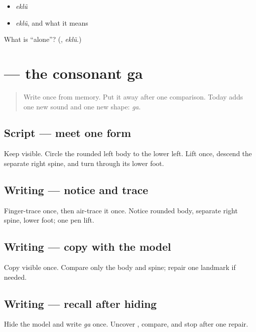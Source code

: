 \begin{itemize}
\raggedright
  \item \emph{eklũ}
  \item \emph{eklũ}, and what it means
\end{itemize}

\begin{tcolorbox}[breakable,colback=teal!4,colframe=teal!35!black,title={Before you move on}]
What is \textquotedblleft{}alone\textquotedblright{}? (\textbf{}, \emph{eklũ}.)
\end{tcolorbox}
\section[\texorpdfstring{\gu{ગ} (ga)}{ગ (ga)}]{ — the consonant ga}

\label{lesson:GU-W06-ga}



\begin{quote}
Write \textbf{} once from memory. Put it away after one comparison. Today adds one new sound and one new shape: \emph{ga}.
\end{quote}

\subsection*{Script — meet one form}
Keep \textbf{} visible. Circle the rounded left body to the lower left. Lift once, descend the separate right spine, and turn through its lower foot.

\subsection*{Writing — notice and trace}

Finger-trace \textbf{} once, then air-trace it once. Notice rounded body, separate right spine, lower foot; one pen lift.

\subsection*{Writing — copy with the model}
Copy visible \textbf{} once. Compare only the body and spine; repair one landmark if needed.

\subsection*{Writing — recall after hiding}
Hide the model and write \emph{ga} once. Uncover \textbf{}, compare, and stop after one repair.

